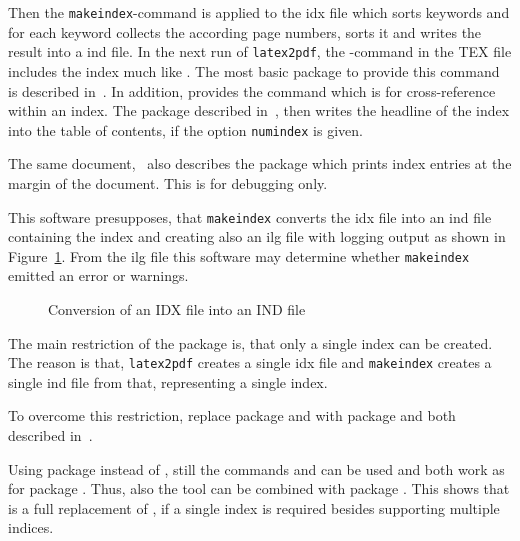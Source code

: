 Then the \texttt{makeindex}-command is applied to the \gls{idx} file 
which sorts keywords and for each keyword collects the according page numbers, 
sorts it and writes the result into a \gls{ind} file. 
In the next run of \texttt{latex2pdf}, 
the -command in the TEX file includes the index much like . 
The most basic package to provide this command 
is  described in~\cite{MkidxShIdxP}. 
In addition,  provides the command  
which is for cross-reference within an index. 
The package  described in~\cite{TocBibIndP}, 
then writes the headline of the index into the table of contents, 
if the option \texttt{numindex} is given.

The same document,~\cite{MkidxShIdxP} 
also describes the package  
which prints index entries at the margin of the document. 
This is for debugging only. 



This software presupposes, that \texttt{makeindex} converts the \gls{idx} file 
into an ind file containing the index 
and creating also an \gls{ilg} file with logging output 
as shown in Figure~\ref{fig:idx2ind}. 
From the \gls{ilg} file this software may determine 
whether \texttt{makeindex} emitted an error or warnings. 

\begin{figure}[htb]
\centering
{}
\caption{\label{fig:idx2ind}Conversion of an IDX file into an IND file}
\end{figure}
\medskip


The main restriction of the package  is, 
that only a single index can be created. 
The reason is that, \texttt{latex2pdf} creates a single \gls{idx} file 
and \texttt{makeindex} creates a single ind file from that, 
representing a single index. 

To overcome this restriction, 
replace package  and  
with package  and  
both described in~\cite{SplitidxP}. 

Using package  instead of , 
still the commands  and  can be used 
and both work as for package . 
Thus, also the tool  can be combined with package . 
This shows that  is a full replacement of , 
if a single index is required besides supporting multiple indices. 


